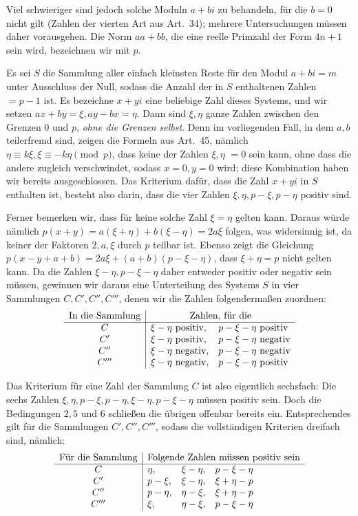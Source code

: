 \newpage
{}
Viel schwieriger sind jedoch solche Moduln $a+bi$ zu behandeln, für die $b=0$ nicht gilt (Zahlen der vierten Art aus Art.~34); mehrere Untersuchungen müssen daher vorausgehen. Die Norm $aa+bb$, die eine reelle Primzahl der Form $4n+1$ sein wird, bezeichnen wir mit $p$.

Es sei $S$ die Sammlung aller einfach kleinsten Reste für den Modul $a+bi=m$ unter Ausschluss der Null, sodass die Anzahl der in $S$ enthaltenen Zahlen $=p-1$ ist. Es bezeichne $x+yi$ eine beliebige Zahl dieses Systems, und wir setzen $ax+by=\xi,ay-bx=\eta$. Dann sind $\xi,\eta$ ganze Zahlen zwischen den Grenzen $0$ und $p$, \emph{ohne die Grenzen selbst}. Denn im vorliegenden Fall, in dem $a,b$ teilerfremd sind, zeigen die Formeln aus Art.~45, nämlich $\eta\equiv k\xi,\xi\equiv-k\eta\pmod p$, dass keine der Zahlen $\xi,\eta$ $=0$ sein kann, ohne dass die andere zugleich verschwindet, sodass $x=0,y=0$ wird; diese Kombination haben wir bereits ausgeschlossen. Das Kriterium dafür, dass die Zahl $x+yi$ in $S$ enthalten ist, besteht also darin, dass die vier Zahlen $\xi,\eta,p-\xi,p-\eta$ positiv sind.

Ferner bemerken wir, dass für keine solche Zahl $\xi=\eta$ gelten kann. Daraus würde nämlich $p(x+y)=a(\xi+\eta)+b(\xi-\eta)=2a\xi$ folgen, was widersinnig ist, da keiner der Faktoren $2,a,\xi$ durch $p$ teilbar ist. Ebenso zeigt die Gleichung $p(x-y+a+b)=2a\xi+(a+b)(p-\xi-\eta)$, dass $\xi+\eta=p$ nicht gelten kann. Da die Zahlen $\xi-\eta,p-\xi-\eta$ daher entweder positiv oder negativ sein müssen, gewinnen wir daraus eine Unterteilung des Systems $S$ in vier Sammlungen $C,C',C'',C'''$, denen wir die Zahlen folgendermaßen zuordnen:
\[
\begin{array}{c|ll}
\text{In die Sammlung}&\multicolumn{2}{c}{\text{Zahlen, für die}}\\\hline
C&\xi-\eta\text{ positiv},&p-\xi-\eta\text{ positiv}\\
C'&\xi-\eta\text{ positiv},&p-\xi-\eta\text{ negativ}\\
C''&\xi-\eta\text{ negativ},&p-\xi-\eta\text{ negativ}\\
C'''&\xi-\eta\text{ negativ},&p-\xi-\eta\text{ positiv}
\end{array}
\]

Das Kriterium für eine Zahl der Sammlung $C$ ist also eigentlich sechsfach: Die sechs Zahlen $\xi,\eta,p-\xi,p-\eta,\xi-\eta,p-\xi-\eta$ müssen positiv sein. Doch die Bedingungen $2,5$ und $6$ schließen die übrigen offenbar bereits ein. Entsprechendes gilt für die Sammlungen $C',C'',C'''$, sodass die vollständigen Kriterien dreifach sind, nämlich:
%
\[
\begin{array}{c|lll}
\text{Für die Sammlung}&\multicolumn{3}{c}{\text{Folgende Zahlen müssen positiv sein}}\\\hline
C&\eta,&\xi-\eta,&p-\xi-\eta\\
C'&p-\xi,&\xi-\eta,&\xi+\eta-p\\
C''&p-\eta,&\eta-\xi,&\xi+\eta-p\\
C'''&\xi,&\eta-\xi,&p-\xi-\eta
\end{array}
\]

